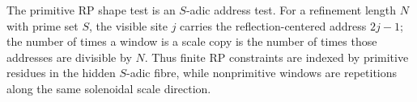 \begin{principle}
\label{prin:innovation-input-solenoid-address-reading}
The primitive RP shape test is an $S$-adic address test. For a refinement
length $N$ with prime set $S$, the visible site $j$ carries the
reflection-centered address $2j-1$; the number of times a window is a
scale copy is the number of times those addresses are divisible by $N$.
Thus finite RP constraints are indexed by primitive residues in the
hidden $S$-adic fibre, while nonprimitive windows are repetitions along
the same solenoidal scale direction.
\end{principle}
